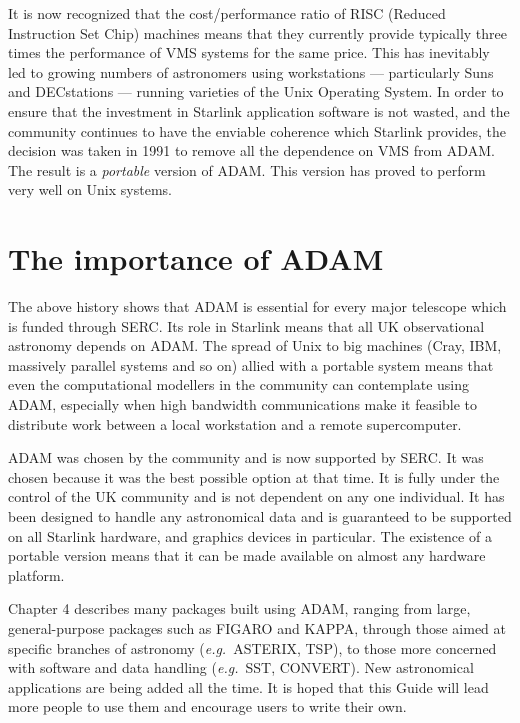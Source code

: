 It is now recognized that the cost/performance ratio of RISC (Reduced
Instruction Set Chip) machines means that they currently provide
typically three times the performance of VMS systems for the same price.
This has inevitably led to growing numbers of astronomers using workstations ---
particularly Suns and DECstations --- running varieties of the Unix Operating
System.
In order to ensure that the investment in Starlink application software is not
wasted, and the community continues to have the enviable coherence which
Starlink provides, the decision was taken in 1991 to remove all the dependence
on VMS from ADAM.
The result is a {\em portable} version of ADAM.
This version has proved to perform very well on Unix systems.

\section*{The importance of ADAM}
\label{S_impadam}

The above history shows that ADAM is essential for every major telescope
which is funded through SERC.
Its role in Starlink means that all UK observational astronomy depends on ADAM.
The spread of Unix to big machines (Cray, IBM, massively parallel systems and
so on) allied with a portable system means that even the computational
modellers in the community can contemplate using ADAM, especially when high
bandwidth communications make it feasible to distribute work between a 
local workstation and a remote supercomputer. 

ADAM was chosen by the community and is now supported by SERC.
It was chosen because it was the best possible option at that time.
It is fully under the control of the UK community and is not dependent on any
one individual.
It has been designed to handle any astronomical data and is guaranteed to be
supported on all Starlink hardware, and graphics devices in particular.
The existence of a portable version means that it can be made available on
almost any hardware platform.

Chapter 4 describes many packages built using ADAM, ranging from large,
general-purpose packages such as FIGARO and KAPPA, through those aimed at
specific branches of astronomy ({\it e.g.}\ ASTERIX, TSP), to those more
concerned with software and data handling ({\it e.g.}\ SST, CONVERT).
New astronomical applications are being added all the time.
It is hoped that this Guide will lead more people to use them and encourage
users to write their own. 
